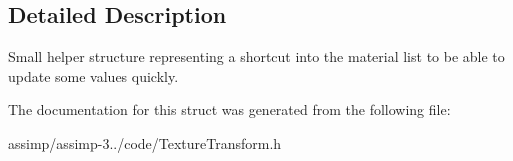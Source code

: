 \subsection{Detailed Description}
Small helper structure representing a shortcut into the material list to be able to update some values quickly. 

The documentation for this struct was generated from the following file\+:\begin{DoxyCompactItemize}
\item 
assimp/assimp-\/3../code/Texture\+Transform.\+h\end{DoxyCompactItemize}
